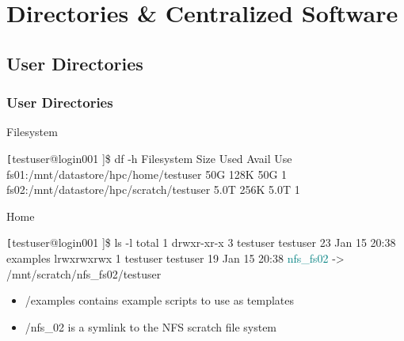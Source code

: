  
\section[Directories \& Centralized Software]{Directories \& Centralized Software }
\subsection{User Directories}
\begin{frame}[fragile]
\frametitle{User Directories}
\begin{block}{Filesystem}
\begin{semiverbatim}\tiny \texttt
[testuser@login001 \ctilde]\$ df -h
Filesystem                                   Size  Used Avail Use%
fs01:/mnt/datastore/hpc/home/testuser         50G  128K   50G   1%
fs02:/mnt/datastore/hpc/scratch/testuser     5.0T  256K  5.0T   1%
\end{semiverbatim}
\end{block}
\begin{block}{Home}
\begin{semiverbatim}\tiny \texttt
[testuser@login001 \ctilde]\$ ls -l 
total 1
drwxr-xr-x 3 testuser testuser 23 Jan 15 20:38 examples
lrwxrwxrwx 1 testuser testuser 19 Jan 15 20:38 \textcolor{teal}{nfs_fs02} -> /mnt/scratch/nfs_fs02/testuser
\end{semiverbatim}
\end{block}
\begin{itemize}
		\item \ctilde{}/examples contains example scripts to use as templates
		\item \ctilde{}/nfs\_02 is a symlink to the NFS scratch file system
\end{itemize}
\end{frame}


